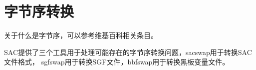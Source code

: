 \section{字节序转换}
\label{sec:bbfswap}
\label{sec:sacswap}
\label{sec:sgfswap}

关于什么是字节序，可以参考维基百科相关条目。

SAC提供了三个工具用于处理可能存在的字节序转换问题，sacswap用于转换SAC文件格式，
sgfswap用于转换SGF文件，bbfswap用于转换黑板变量文件。